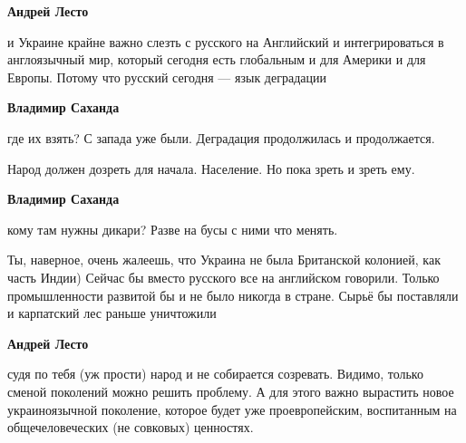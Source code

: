 \begin{itemize}
\begin{itemize}
\textbf{Андрей Лесто} 

и Украине крайне важно слезть с русского на Английский и интегрироваться в
англоязычный мир, который сегодня есть глобальным и для Америки и для Европы.
Потому что русский сегодня — язык деградации


 
\textbf{Владимир Саханда} 

где их взять? С запада уже были. Деградация продолжилась и продолжается.

Народ должен дозреть для начала. Население. Но пока зреть и зреть ему.

 
\textbf{Владимир Саханда} 

кому там нужны дикари? Разве на бусы с ними что менять.

Ты, наверное, очень жалеешь, что Украина не была Британской колонией, как часть
Индии) Сейчас бы вместо русского все на английском говорили. Только
промышленности развитой бы и не было никогда в стране. Сырьё бы поставляли и
карпатский лес раньше уничтожили

 
\textbf{Андрей Лесто} 

судя по тебя (уж прости) народ и не собирается созревать. Видимо, только сменой
поколений можно решить проблему. А для этого важно вырастить новое
украиноязычной поколение, которое будет уже проевропейским, воспитанным на
общечеловеческих (не совковых) ценностях.


 

\end{itemize}
\end{itemize}
